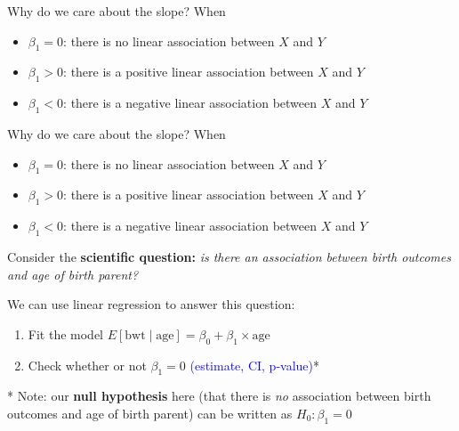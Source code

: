 \documentclass[10pt,t]{beamer}
\begin{document}
\begin{frame}{Why do we care about the slope?}
When
\begin{itemize}
	\item $\beta_1 = 0$: there is no linear association between $X$ and $Y$
	\item $\beta_1 > 0$: there is a positive linear association between $X$ and $Y$
	\item $\beta_1 < 0$: there is a negative linear association between $X$ and $Y$
\end{itemize}

\end{frame}

\begin{frame}{Why do we care about the slope?}
When
\begin{itemize}
	\item $\beta_1 = 0$: there is no linear association between $X$ and $Y$
	\item $\beta_1 > 0$: there is a positive linear association between $X$ and $Y$
	\item $\beta_1 < 0$: there is a negative linear association between $X$ and $Y$
\end{itemize}

\vspace{0.3cm}

Consider the \textbf{scientific question:} \textit{is there an association between birth outcomes and age of birth parent?}

\vspace{0.3cm}

We can use linear regression to answer this question:

\begin{enumerate}
	\item Fit the model $E[\text{bwt} \mid \text{age}] = \beta_0 + \beta_1 \times \text{age}$
	\item Check whether or not $\beta_1 = 0$ \textcolor{blue}{(estimate, CI, p-value)}*
\end{enumerate}

\vspace{0.3cm}

* Note: our \textbf{null hypothesis} here (that there is \textit{no} association between birth outcomes and age of birth parent) can be written as $H_0: \beta_1 = 0$

\end{frame}
\end{document}
